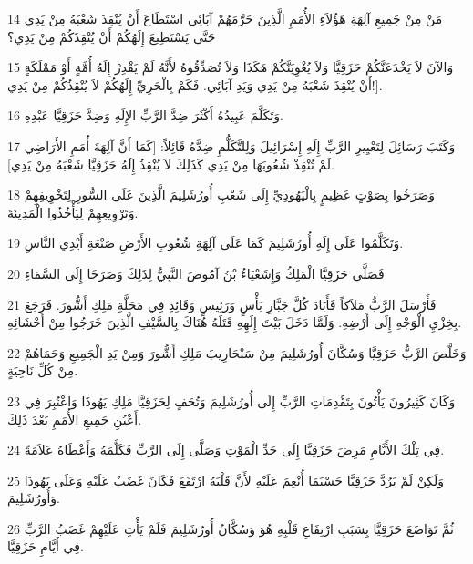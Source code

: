 \par 14 مَنْ مِنْ جَمِيعِ آلِهَةِ هَؤُلاَءِ الأُمَمِ الَّذِينَ حَرَّمَهُمْ آبَائِي اسْتَطَاعَ أَنْ يُنْقِذَ شَعْبَهُ مِنْ يَدِي حَتَّى يَسْتَطِيعَ إِلَهُكُمْ أَنْ يُنْقِذَكُمْ مِنْ يَدِي؟
\par 15 وَالآنَ لاَ يَخْدَعَنَّكُمْ حَزَقِيَّا وَلاَ يُغْوِيَنَّكُمْ هَكَذَا وَلاَ تُصَدِّقُوهُ لأَنَّهُ لَمْ يَقْدِرْ إِلَهُ أُمَّةٍ أَوْ مَمْلَكَةٍ أَنْ يُنْقِذَ شَعْبَهُ مِنْ يَدِي وَيَدِ آبَائِي. فَكَمْ بِالْحَرِيِّ إِلَهُكُمْ لاَ يُنْقِذُكُمْ مِنْ يَدِي!].
\par 16 وَتَكَلَّمَ عَبِيدُهُ أَكْثَرَ ضِدَّ الرَّبِّ الإِلَهِ وَضِدَّ حَزَقِيَّا عَبْدِهِ.
\par 17 وَكَتَبَ رَسَائِلَ لِتَعْيِيرِ الرَّبِّ إِلَهِ إِسْرَائِيلَ وَلِلتَّكَلُّمِ ضِدَّهُ قَائِلاً: [كَمَا أَنَّ آلِهَةَ أُمَمِ الأَرَاضِي لَمْ تُنْقِذْ شُعُوبَهَا مِنْ يَدِي كَذَلِكَ لاَ يُنْقِذُ إِلَهُ حَزَقِيَّا شَعْبَهُ مِنْ يَدِي].
\par 18 وَصَرَخُوا بِصَوْتٍ عَظِيمٍ بِالْيَهُودِيِّ إِلَى شَعْبِ أُورُشَلِيمَ الَّذِينَ عَلَى السُّورِ لِتَخْوِيفِهِمْ وَتَرْوِيعِهِمْ لِيَأْخُذُوا الْمَدِينَةَ.
\par 19 وَتَكَلَّمُوا عَلَى إِلَهِ أُورُشَلِيمَ كَمَا عَلَى آلِهَةِ شُعُوبِ الأَرْضِ صَنْعَةِ أَيْدِي النَّاسِ.
\par 20 فَصَلَّى حَزَقِيَّا الْمَلِكُ وَإِشَعْيَاءُ بْنُ آمُوصَ النَّبِيُّ لِذَلِكَ وَصَرَخَا إِلَى السَّمَاءِ
\par 21 فَأَرْسَلَ الرَّبُّ مَلاَكاً فَأَبَادَ كُلَّ جَبَّارِ بَأْسٍ وَرَئِيسٍ وَقَائِدٍ فِي مَحَلَّةِ مَلِكِ أَشُّورَ. فَرَجَعَ بِخِزْيِ الْوَجْهِ إِلَى أَرْضِهِ. وَلَمَّا دَخَلَ بَيْتَ إِلَهِهِ قَتَلَهُ هُنَاكَ بِالسَّيْفِ الَّذِينَ خَرَجُوا مِنْ أَحْشَائِهِ.
\par 22 وَخَلَّصَ الرَّبُّ حَزَقِيَّا وَسُكَّانَ أُورُشَلِيمَ مِنْ سَنْحَارِيبَ مَلِكِ أَشُّورَ وَمِنْ يَدِ الْجَمِيعِ وَحَمَاهُمْ مِنْ كُلِّ نَاحِيَةٍ.
\par 23 وَكَانَ كَثِيرُونَ يَأْتُونَ بِتَقْدِمَاتِ الرَّبِّ إِلَى أُورُشَلِيمَ وَتُحَفٍ لِحَزَقِيَّا مَلِكِ يَهُوذَا وَاعْتُبِرَ فِي أَعْيُنِ جَمِيعِ الأُمَمِ بَعْدَ ذَلِكَ.
\par 24 فِي تِلْكَ الأَيَّامِ مَرِضَ حَزَقِيَّا إِلَى حَدِّ الْمَوْتِ وَصَلَّى إِلَى الرَّبِّ فَكَلَّمَهُ وَأَعْطَاهُ عَلاَمَةً.
\par 25 وَلَكِنْ لَمْ يَرُدَّ حَزَقِيَّا حَسْبَمَا أُنْعِمَ عَلَيْهِ لأَنَّ قَلْبَهُ ارْتَفَعَ فَكَانَ غَضَبٌ عَلَيْهِ وَعَلَى يَهُوذَا وَأُورُشَلِيمَ.
\par 26 ثُمَّ تَوَاضَعَ حَزَقِيَّا بِسَبَبِ ارْتِفَاعِ قَلْبِهِ هُوَ وَسُكَّانُ أُورُشَلِيمَ فَلَمْ يَأْتِ عَلَيْهِمْ غَضَبُ الرَّبِّ فِي أَيَّامِ حَزَقِيَّا.
